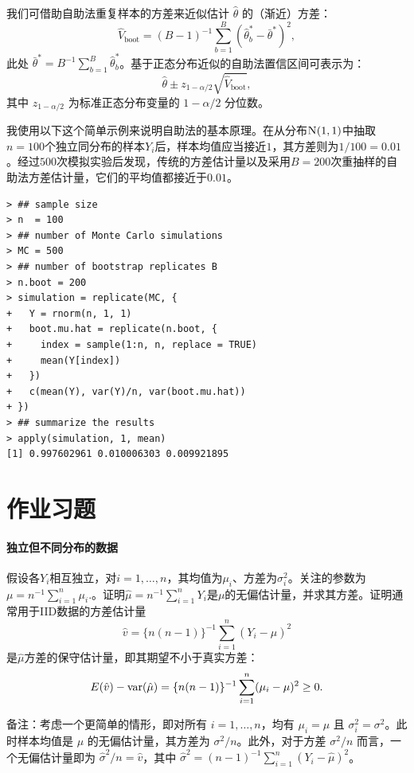 我们可借助自助法重复样本的方差来近似估计 $\hat\theta$ 的（渐近）方差：
$$
\hat{V}_\text{boot} = (B-1)^{-1} \sum_{b=1}^B  (\hat{\theta}^*_b - \bar{\theta}^*)^2,
$$
此处 $\bar{\theta}^* = B^{-1}\sum_{b=1}^B \hat{\theta}^*_b $。基于正态分布近似的自助法置信区间可表示为：
$$
\hat\theta \pm  z_{1-\alpha/2} \sqrt{\hat{V}_\text{boot} },
$$
其中 $z_{1-\alpha/2}$ 为标准正态分布变量的 $1-\alpha/2$ 分位数。



我使用以下这个简单示例来说明自助法的基本原理。在从分布$\textsc{N}(1,1)$中抽取$n=100$个独立同分布的样本$Y_i$后，样本均值应当接近$1$，其方差则为$1/100 = 0.01$。经过$500$次模拟实验后发现，传统的方差估计量以及采用$B=200$次重抽样的自助法方差估计量，它们的平均值都接近于$0.01$。 

\begin{lstlisting}
> ## sample size
> n  = 100
> ## number of Monte Carlo simulations
> MC = 500
> ## number of bootstrap replicates B
> n.boot = 200
> simulation = replicate(MC, {
+   Y = rnorm(n, 1, 1)
+   boot.mu.hat = replicate(n.boot, {
+     index = sample(1:n, n, replace = TRUE)
+     mean(Y[index])
+   })
+   c(mean(Y), var(Y)/n, var(boot.mu.hat))
+ })
> ## summarize the results
> apply(simulation, 1, mean)
[1] 0.997602961 0.010006303 0.009921895
\end{lstlisting}




\section{作业习题}

\paragraph{独立但不同分布的数据}
\label{hw::inid}

假设各$Y_i$相互独立，对$i=1,\ldots, n$，其均值为$\mu_i$、方差为$\sigma_i^2$。关注的参数为$
\mu = n^{-1} \sum_{i=1}^n \mu_i.
$。证明$
\hat\mu = n^{-1} \sum_{i=1}^n Y_i
$是$\mu$的无偏估计量，并求其方差。证明通常用于IID数据的方差估计量$$
\hat{v} = \{  n(n-1) \}^{-1} \sum_{i=1}^n (Y_i -  \hat{\mu})^2
$$是$\hat\mu$方差的保守估计量，即其期望不小于真实方差：$$
E(\hat{v}) - \textup{var}( \hat\mu ) = \{  n(n-1) \}^{-1} \sum_{i=1}^n (\mu_i - \mu)^2 \geq 0. 
$$

备注：考虑一个更简单的情形，即对所有 $i=1,\ldots, n$，均有 $\mu_i = \mu$ 且 $\sigma_i^2 = \sigma^2$。此时样本均值是 $\mu$ 的无偏估计量，其方差为 $\sigma^2/n$。此外，对于方差 $\sigma^2/n$ 而言，一个无偏估计量即为 $\hat \sigma^2/n = \hat v$，其中 $\hat\sigma^2 = (n-1)^{-1} \sum_{i=1}^n (Y_i -  \hat{\mu})^2$。

